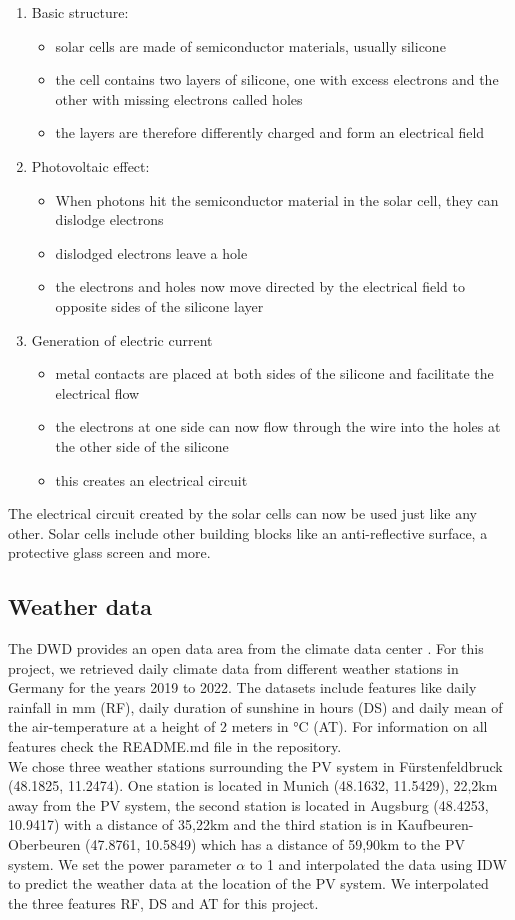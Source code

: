\documentclass{article}
\begin{document}
\begin{enumerate}
	\item Basic structure: \begin{itemize}
			\item solar cells are made of semiconductor materials, usually silicone
			\item the cell contains two layers of silicone, one with excess electrons and the other with missing electrons called holes
			\item the layers are therefore differently charged and form an electrical field
	\end{itemize}
	\item Photovoltaic effect: \begin{itemize}
		\item When photons hit the semiconductor material in the solar cell, they can dislodge electrons
		\item dislodged electrons leave a hole
		\item the electrons and holes now move directed by the electrical field to opposite sides of the silicone layer
	\end{itemize}
	\item Generation of electric current \begin{itemize}
		\item metal contacts are placed at both sides of the silicone and facilitate the electrical flow
		\item the electrons at one side can now flow through the wire into the holes at the other side of the silicone
		\item this creates an electrical circuit
	\end{itemize}
\end{enumerate}
The electrical circuit created by the solar cells can now be used just like any other. Solar cells include other building blocks like an anti-reflective surface, a protective glass screen and more. \citep{SolarCells}
\subsection{Weather data}
The DWD provides an open data area from the climate data center \cite{CDC}. For this project, we retrieved daily climate data from different weather stations in Germany for the years 2019 to 2022. The datasets include features like daily rainfall in mm (RF), daily duration of sunshine in hours (DS) and daily mean of the air-temperature at a height of 2 meters in °C (AT). For information on all features check the README.md file in the repository. \\ We chose three weather stations surrounding the PV system in Fürstenfeldbruck (48.1825, 11.2474). One station is located in Munich (48.1632, 11.5429), 22,2km away from the PV system, the second station is located in Augsburg (48.4253, 10.9417) with a distance of 35,22km and the third station is in Kaufbeuren-Oberbeuren (47.8761, 10.5849) which has a distance of 59,90km to the PV system. We set the power parameter $\alpha$ to 1 and interpolated the data using IDW to predict the weather data at the location of the PV system. We interpolated the three features RF, DS and AT for this project.
\end{document}

